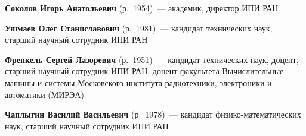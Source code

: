 \begin{multicols}{2}
\noindent
\textbf{Соколов Игорь Анатольевич} (р.\ 1954)~---  
академик, директор ИПИ РАН

\vspace*{12pt}

\noindent
\textbf{Ушмаев Олег Станиславович} (р.\ 1981)~---  кандидат 
технических наук, старший научный сотрудник ИПИ РАН

\vspace*{12pt}

\noindent
\textbf{Френкель Сергей Лазоревич} (р.\ 1951)~---  кандидат\linebreak
технических наук, 
доцент, старший научный сотрудник ИПИ РАН, доцент факультета 
Вы\-чис\-ли\-тель\-ные машины и системы Московского института радиотехники,
электроники и автоматики (\mbox{МИРЭА})

\vspace*{12pt}

\noindent
\textbf{Чаплыгин Василий Васильевич} (р.\ 1978)~---  
кандидат физико-математических наук,
старший научный сотрудник ИПИ РАН





\end{multicols}